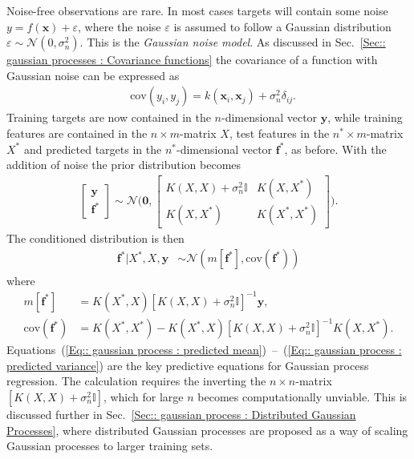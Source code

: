 \documentclass[twoside,english]{uiofysmaster}
\begin{document}
{{Noise-free observations are rare. In most cases targets will contain some noise $y = f(\textbf{x}) + \varepsilon$, where the noise $\varepsilon$ is assumed to follow a Gaussian distribution $\varepsilon \sim \mathcal{N}(0, \sigma_n^2)$. This is the \textit{Gaussian noise model}. As discussed in Sec.~\ref{Sec:: gaussian processes : Covariance functions} the covariance of a function with Gaussian noise can be expressed as
\begin{align}
&\text{cov}(y_i, y_j) = k(\textbf{x}_i, \textbf{x}_j) + \sigma_n^2 \delta_{ij}.
\end{align}
Training targets are now contained in the $n$-dimensional vector $\textbf{y}$, while training features are contained in the $n \times m$-matrix $X$, test features in the $n^* \times m$-matrix $X^*$ and predicted targets in the $n^*$-dimensional vector $\textbf{f}^*$, as before. With the addition of noise the prior distribution becomes
\begin{align}
\begin{bmatrix}
\textbf{y}\\
\textbf{f}^*
\end{bmatrix}
\sim 
\mathcal{N} \Bigg(
\boldsymbol{0},
\begin{bmatrix}
K(X, X) + \sigma_n^2 \mathbb{I} & K(X, X^*)\\
K(X, X^*) & K(X^*, X^*)
\end{bmatrix}
 \Bigg).
\end{align}
The conditioned distribution is then 
\begin{align}
\textbf{f}^* \big| X^*, X, \textbf{y} & \sim \mathcal{N}(m[\textbf{f}^*], \text{cov}(\textbf{f}^*))
\end{align}
where
\begin{align}
m[\textbf{f}^*] &= K(X^*, X) [K(X, X) + \sigma_n^2 \mathbb{I}]^{-1} \textbf{y},\label{Eq:: gaussian process : predicted mean}\\ 
\text{cov} (\textbf{f}^*) &= K(X^*, X^*) - K(X^*, X)[K(X, X) + \sigma_n^2 \mathbb{I}]^{-1} K(X, X^*). \label{Eq:: gaussian process : predicted variance}
\end{align}
Equations~(\ref{Eq:: gaussian process : predicted mean})~--~(\ref{Eq:: gaussian process : predicted variance}) are the key predictive equations for Gaussian process regression. The calculation requires the inverting the $n \times n$-matrix $[K(X,X) + \sigma_n^2 \mathbb{I}]$, which for large $n$ becomes computationally unviable. This is discussed further in Sec.~\ref{Sec:: gaussian process : Distributed Gaussian Processes}, where distributed Gaussian processes are proposed as a way of scaling Gaussian processes to larger training sets.

}}
\end{document}

